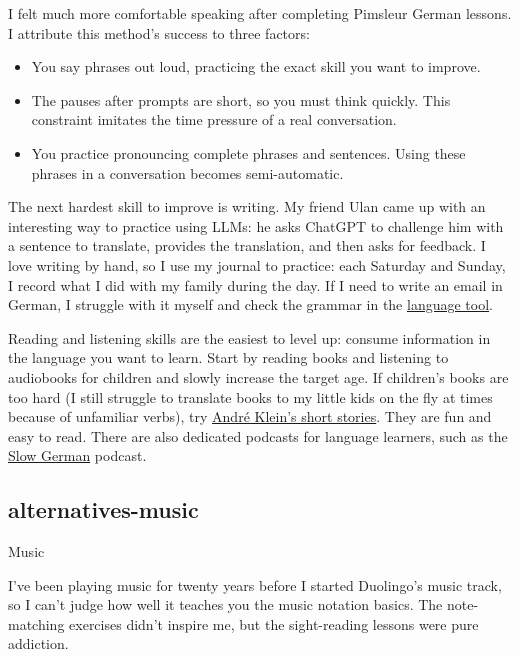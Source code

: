 \documentclass{article}
\begin{document}
I felt much more comfortable speaking after completing Pimsleur German lessons.
I attribute this method's success to three factors:
\begin{itemize}
\item You say phrases out loud, practicing the exact skill you want to improve.
\item The pauses after prompts are short, so you must think quickly.
  This constraint imitates the time pressure of a real conversation.
\item You practice pronouncing complete phrases and sentences.
  Using these phrases in a conversation becomes semi-automatic.
\end{itemize}

The next hardest skill to improve is writing.
My friend Ulan came up with an interesting way to practice using LLMs:
he asks ChatGPT to challenge him with a sentence to translate,
provides the translation,
and then asks for feedback.
I love writing by hand, so I use my journal to practice:
each Saturday and Sunday, I record what I did with my family during the day.
If I need to write an email in German,
I struggle with it myself and check the grammar in the \href{https://languagetool.org/}{language tool}.

Reading and listening skills are the easiest to level up: consume information in the language you want to learn.
Start by reading books and listening to audiobooks for children and slowly increase the target age.
If children's books are too hard (I still struggle to translate books to my little kids on the fly at times because of unfamiliar verbs),
try \href{https://www.goodreads.com/book/show/18806935-caf-in-berlin}{André Klein's short stories}.
They are fun and easy to read.
There are also dedicated podcasts for language learners, such as the \href{https://slowgerman.com/}{Slow German} podcast.

\subsection{alternatives-music}{Music}

I've been playing music for twenty years before I started Duolingo's music track,
so I can't judge how well it teaches you the music notation basics.
The note-matching exercises didn't inspire me,
but the sight-reading lessons were pure addiction.
\end{document}
